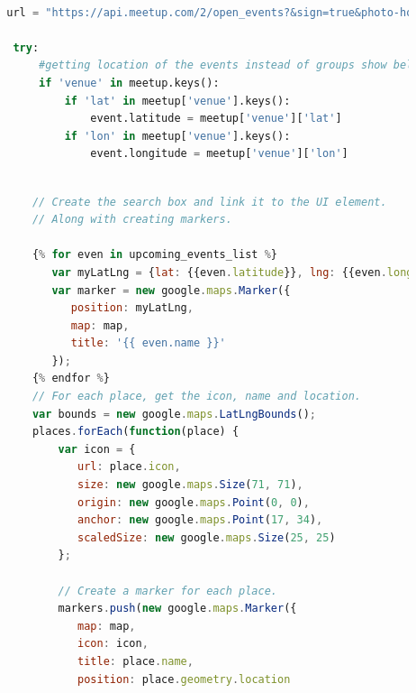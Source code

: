 \documentclass[draftclsnofoot,10pt,onecolumn]{IEEEtran} %
\begin{document}
\begin{center}
\captionsetup{width=.5\linewidth}
	\begin{lstlisting}[caption=Views.py shows the eventSearch funciton that allows the view in the template for the events page to pull information from the database. This also shows the URL used to get the info about events along with how it is stored., language=Python]
       
        url = "https://api.meetup.com/2/open_events?&sign=true&photo-host=public&state=ky&city=lexington&country=usa&topic=" + hashtag.name + "&radius=10000&sign=true&key=" + MEETUP_API_KEY

         try:
             #getting location of the events instead of groups show below
             if 'venue' in meetup.keys():
                 if 'lat' in meetup['venue'].keys():
                     event.latitude = meetup['venue']['lat']
                 if 'lon' in meetup['venue'].keys():
                     event.longitude = meetup['venue']['lon']
	\end{lstlisting}
\end{center}

\begin{center}
\captionsetup{width=.5\linewidth}
	\begin{lstlisting}[caption=The eventSearch.html has a mixture of JavaScript and HTML that create the Google Map and search bar along with creating markers for events., language=JavaScript]
           
            // Create the search box and link it to the UI element. 
            // Along with creating markers.

            {% for even in upcoming_events_list %}
               var myLatLng = {lat: {{even.latitude}}, lng: {{even.longitude}}};
               var marker = new google.maps.Marker({
                  position: myLatLng,
                  map: map,
                  title: '{{ even.name }}'
               });
            {% endfor %}
            // For each place, get the icon, name and location.
            var bounds = new google.maps.LatLngBounds();
            places.forEach(function(place) {
                var icon = {
                   url: place.icon,
                   size: new google.maps.Size(71, 71),
                   origin: new google.maps.Point(0, 0),
                   anchor: new google.maps.Point(17, 34),
                   scaledSize: new google.maps.Size(25, 25)
                };

                // Create a marker for each place.
                markers.push(new google.maps.Marker({
                   map: map,
                   icon: icon,
                   title: place.name,
                   position: place.geometry.location
                   
	\end{lstlisting}
\end{center}
\end{document}
